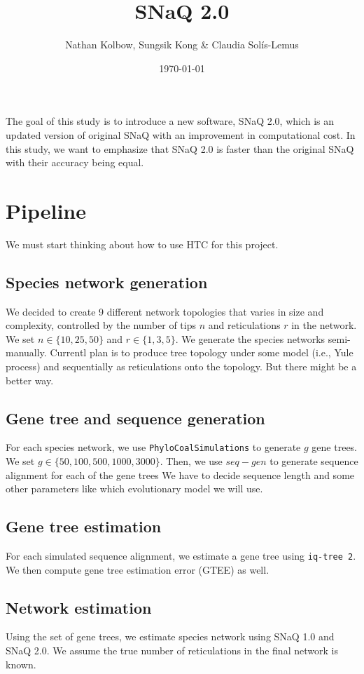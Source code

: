 \documentclass{article}
\title{SNaQ 2.0}
\author{Nathan Kolbow, Sungsik Kong \& Claudia Solís-Lemus}
\date{\today}
\newcommand{\kevin}{\color{blue}}
\begin{document}
\maketitle

The goal of this study is to introduce a new software, SNaQ 2.0, which is an updated version of original SNaQ with an improvement in computational cost. In this study, we want to emphasize that SNaQ 2.0 is faster than the original SNaQ with their accuracy being equal.

\section{Pipeline}

{\kevin We must start thinking about how to use HTC for this project.}

\subsection{Species network generation}
We decided to create 9 different network topologies that varies in size and complexity, controlled by the number of tips $n$ and reticulations $r$ in the network. We set $n \in \{10, 25, 50\}$ and $r \in \{1, 3, 5\}$. We generate the species networks semi-manually. Currentl plan is to produce tree topology under some model (i.e., Yule process) and sequentially as reticulations onto the topology. But there might be a better way. 

\subsection{Gene tree and sequence generation}
For each species network, we use \texttt{PhyloCoalSimulations} to generate $g$ gene trees. We set $g \in \{50, 100, 500, 1000, 3000\}$. Then, we use $seq-gen$ to generate sequence alignment for each of the gene trees {\kevin We have to decide sequence length and some other parameters like which evolutionary model we will use.}

\subsection{Gene tree estimation}
For each simulated sequence alignment, we estimate a gene tree using \texttt{iq-tree 2}. We then compute gene tree estimation error (GTEE) as well.

\subsection{Network estimation}
Using the set of gene trees, we estimate species network using SNaQ 1.0 and SNaQ 2.0. We assume the true number of reticulations in the final network is known.
\end{document}
